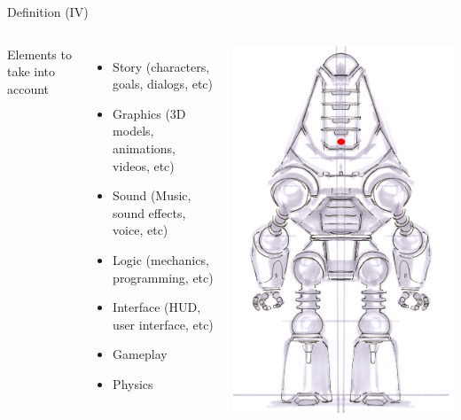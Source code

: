 \documentclass[10pt,compress]{beamer} %
\begin{document}
\begin{frame}{Definition (IV)}
    \begin{columns}
		Elements to take into account

 	 	\begin{itemize}
		\item Story (characters, goals, dialogs, etc)
		\item Graphics (3D models, animations, videos, etc)
		\item Sound (Music, sound effects, voice, etc)
		\item Logic (mechanics, programming, etc)
		\item Interface (\alert{HUD}, \alert{user interface}, etc)
		\item \alert{Gameplay}
		\item \alert{Physics}
		\end{itemize}

		\centering\includegraphics[width=0.7\linewidth]{figs/ProtectronCA2}\\
	\end{columns}
\end{frame}
\end{document}
